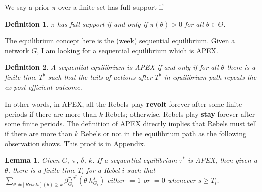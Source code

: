 \documentclass[12pt,letter]{article}
\newtheorem{lemma}{Lemma}[section]
\newtheorem{definition}{Definition}[section]
\theoremstyle{definition}
\theoremstyle{remark}
\theoremstyle{claim}
\begin{document}
We say a prior $\pi$ over a finite set has full support if  
\begin{definition}
$\pi$ has full support if and only if $\pi(\theta)>0$ for all $\theta\in \Theta$.
\end{definition}

The equilibrium concept here is the (week) sequential equilibrium. Given a network $G$, I am looking for a sequential equilibrium which is APEX. 

\begin{definition}\label{Def_expost_efficient}
A sequential equilibrium is APEX if and only if for all $\theta$ there is a finite time $T^{\theta}$ such that the tails of actions after $T^{\theta}$ in equilibrium path repeats the ex-post efficient outcome.
\end{definition}

In other words, in APEX, all the Rebels play \textbf{revolt} forever after some finite periods if there are more than $k$ Rebels; otherwise, Rebels play \textbf{stay} forever after some finite periods. The definition of APEX directly implies that Rebels must tell if there are more than $k$ Rebels or not in the equilibrium path as the following observation shows. This proof is in Appendix.

\begin{lemma}\label{lemma_learn}
Given $G$, $\pi$, $\delta$, $k$. If a sequential equilibrium $\tau^*$ is APEX, then given a $\theta$, there is a finite time $T_i$ for a Rebel $i$ such that $\sum_{\theta:\#[Rebels](\theta)\geq k}\beta^{\pi,\tau^*}_{G_i}(\theta|h^{s}_{G_i})$ either $=1$ or $=0$
whenever $s\geq T_i$.
\end{lemma}
\end{document}
